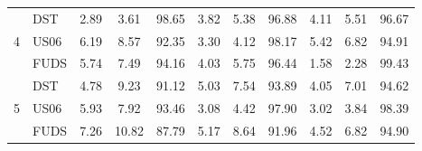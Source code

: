 \begin{table}[htbp]
{\begin{tabular}{ c| l| c c c| c c c |c c c}
    \hline
      & DST & 2.89 & 3.61 & 98.65 & 3.82 & 5.38 & 96.88 & 4.11 & 5.51 & 96.67 \\ 
    4 & US06 & 6.19 & 8.57 & 92.35 & 3.30 & 4.12 & 98.17 & 5.42 & 6.82 & 94.91 \\ 
      & FUDS & 5.74 & 7.49 & 94.16 & 4.03 & 5.75 & 96.44 & 1.58 & 2.28 & 99.43 \\ 
    \hline
      & DST & 4.78 & 9.23 & 91.12 & 5.03 & 7.54 & 93.89 & 4.05 & 7.01 & 94.62 \\ 
    5 & US06 & 5.93 & 7.92 & 93.46 & 3.08 & 4.42 & 97.90 & 3.02 & 3.84 & 98.39 \\ 
      & FUDS & 7.26 & 10.82 & 87.79 & 5.17 & 8.64 & 91.96 & 4.52 & 6.82 & 94.90 \\ 

    

\end{tabular}}
\end{table}
